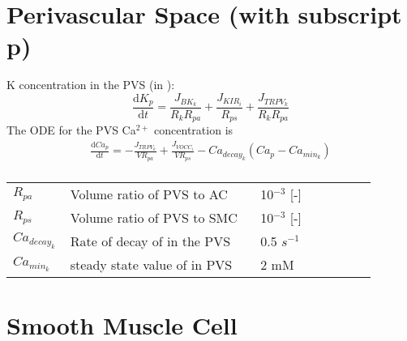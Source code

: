 \documentclass[fleqn]{report}
\numberwithin{equation}{section}
\numberwithin{equation}{section}
\newcommand{\Ca}{\text{Ca$^{2+}$}}
\begin{document}
	\section{Perivascular Space (with subscript p)}	
	\gls{K} concentration in the PVS  (in \uM):
	\begin{equation} \label{eq:K_p}
	\dfrac{\mathrm{d}K_{p}}{\mathrm{d}t}= \frac{J_{BK_k}}{R_k R_{pa}} + \frac{J_{KIR_i}}{ R_{ps}}+\frac{J_{TRPV_{k}}}{R_k R_{pa}}
	\end{equation}
	The ODE for the PVS Ca$^{2+}$ concentration is
	\begin{eqnarray}
	\frac{\mathrm{d}Ca_{p}}{\mathrm{d}t} = -\frac{J_{TRPV_{k}}}{VR_{pa}}+\frac{J_{VOCC_{i}}}{VR_{ps}}-Ca_{decay_{k}}(Ca_{p}-Ca_{min_k})\\
	\end{eqnarray}
	\begin{table}[h!]
	\centering
	\begin{tabular}{ p{0.09\linewidth}  >{\footnotesize} p{0.5\linewidth}  >{\footnotesize} p{0.27\linewidth} >{\footnotesize} p{0.03\linewidth} }
	\hline
	$ R_{pa} $  & Volume ratio of PVS to AC & 10$^{-3}$ [-] & \cite{Nagelhus1999} \\
	$ R_{ps} $  & Volume ratio of PVS to SMC & 10$^{-3}$ [-] & \cite{Nagelhus1999} \\
	$Ca_{decay_{k}}$ & Rate of decay of \Ca in the PVS   & 0.5  $s^{-1}$ & \\
	$Ca_{min_k}$ & steady state value of \Ca in PVS  & 2 mM  &  \\
	\hline
	\end{tabular}
	\end{table}
	
	\section{Smooth Muscle Cell}
\end{document}
